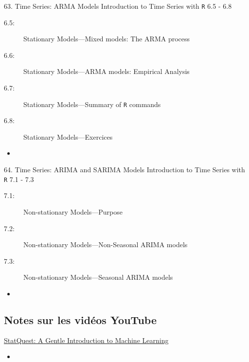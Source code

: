 \begin{CHPT_SUMM_AUTO}[label = {L.-63}]{63. Time Series: ARMA Models}
Introduction to Time Series with \texttt{R} 6.5 - 6.8
\begin{description}
	\item[6.5:]	Stationary Models---Mixed models: The ARMA process
	\item[6.6:]	Stationary Models---ARMA models: Empirical Analysis
	\item[6.7:]	Stationary Models---Summary of \texttt{R} commands
	\item[6.8:]	Stationary Models---Exercices
\end{description}
\tcbline
	\begin{itemize}
		\item	
	\end{itemize}
\end{CHPT_SUMM_AUTO}

\begin{CHPT_SUMM_AUTO}[label = {L.-64}]{64. Time Series: ARIMA and SARIMA Models}
Introduction to Time Series with \texttt{R} 7.1 - 7.3
\begin{description}
	\item[7.1:]	Non-stationary Models---Purpose
	\item[7.2:]	Non-stationary Models---Non-Seasonal ARIMA models
	\item[7.3:]	Non-stationary Models---Seasonal ARIMA models
\end{description}
\tcbline
	\begin{itemize}
		\item	
	\end{itemize}
\end{CHPT_SUMM_AUTO}

\subsection{Notes sur les vidéos YouTube}

\begin{YTB_SUMM}[label = {SQ-BASICS-ML-INTRO}]{\href{https://www.youtube.com/watch?v=Gv9_4yMHFhI&list=PLblh5JKOoLUICTaGLRoHQDuF_7q2GfuJF&index=2&t=0s}{StatQuest: A Gentle Introduction to Machine Learning}}
\begin{itemize}
	\item	
\end{itemize}
\end{YTB_SUMM}
